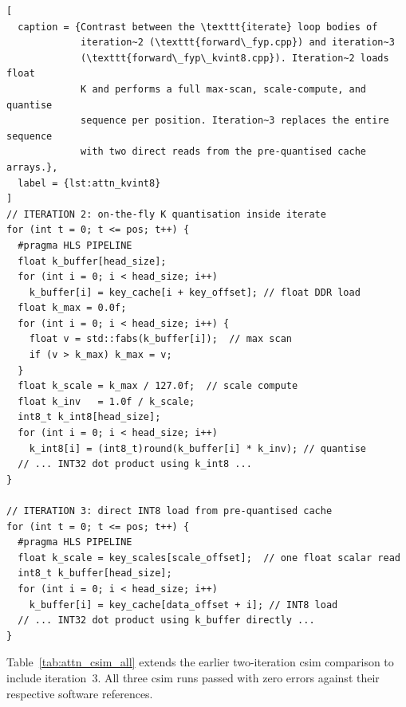 \begin{lstlisting}[
  caption = {Contrast between the \texttt{iterate} loop bodies of
             iteration~2 (\texttt{forward\_fyp.cpp}) and iteration~3
             (\texttt{forward\_fyp\_kvint8.cpp}). Iteration~2 loads float
             K and performs a full max-scan, scale-compute, and quantise
             sequence per position. Iteration~3 replaces the entire sequence
             with two direct reads from the pre-quantised cache arrays.},
  label = {lst:attn_kvint8}
]
// ITERATION 2: on-the-fly K quantisation inside iterate
for (int t = 0; t <= pos; t++) {
  #pragma HLS PIPELINE
  float k_buffer[head_size];
  for (int i = 0; i < head_size; i++)
    k_buffer[i] = key_cache[i + key_offset]; // float DDR load
  float k_max = 0.0f;
  for (int i = 0; i < head_size; i++) {
    float v = std::fabs(k_buffer[i]);  // max scan
    if (v > k_max) k_max = v;
  }
  float k_scale = k_max / 127.0f;  // scale compute
  float k_inv   = 1.0f / k_scale;
  int8_t k_int8[head_size];
  for (int i = 0; i < head_size; i++)
    k_int8[i] = (int8_t)round(k_buffer[i] * k_inv); // quantise
  // ... INT32 dot product using k_int8 ...
}

// ITERATION 3: direct INT8 load from pre-quantised cache
for (int t = 0; t <= pos; t++) {
  #pragma HLS PIPELINE
  float k_scale = key_scales[scale_offset];  // one float scalar read
  int8_t k_buffer[head_size];
  for (int i = 0; i < head_size; i++)
    k_buffer[i] = key_cache[data_offset + i]; // INT8 load
  // ... INT32 dot product using k_buffer directly ...
}
\end{lstlisting}

Table~\ref{tab:attn_csim_all} extends the earlier two-iteration csim
comparison to include iteration~3. All three csim runs passed with zero
errors against their respective software references.

